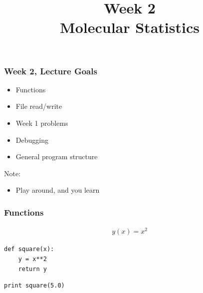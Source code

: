 

\usepackage{soul}

\title[]{Week 2\\Molecular Statistics}








{
\usebackgroundtemplate{}
\begin{frame}[plain]
    \titlepage
    \addtocounter{framenumber}{-1}
\end{frame}
}

\begin{frame}[fragile]

    \frametitle{Week 2, Lecture Goals}

    \begin{itemize}
        \item Functions
        \item File read/write
        \item Week 1 problems
        \item Debugging
        \item General program structure
    \end{itemize}

    \bigskip

    Note:
    \begin{itemize}

        \item Play around, and you learn

    \end{itemize}

\end{frame}


\begin{frame}[fragile]

    \frametitle{Functions}

    \begin{align*}
        y(x) = x^2
    \end{align*}

    \bigskip
    \bigskip

\begin{lstlisting}
def square(x):
    y = x**2
    return y

\end{lstlisting}

\begin{lstlisting}
print square(5.0)

\end{lstlisting}



\end{frame}


